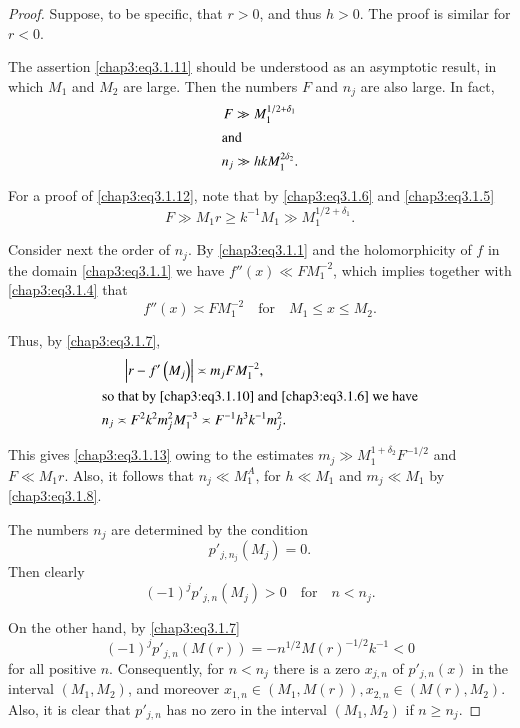 \begin{proof}
Suppose, to be specific, that $r>0$, and thus $h>0$. The proof is
similar for $r<0$.

The assertion \eqref{chap3:eq3.1.11} should be understood as an
asymptotic result, in which $M_1$ and $M_2$ are large. Then the
numbers $F$ and $n_j$ are also large. In fact,
\begin{gather}
F\gg M_1^{1/2+\delta_1}\label{chap3:eq3.1.12}\\
\intertext{and}
n_j\gg hkM_1^{2\delta_2}.\label{chap3:eq3.1.13}
\end{gather}

For a proof of \eqref{chap3:eq3.1.12}, note that by
\eqref{chap3:eq3.1.6} and \eqref{chap3:eq3.1.5}
$$
F\gg M_1r\geq k^{-1}M_1\gg M_1^{1/2+\delta_1}.
$$

Consider next the order of $n_j$. By \eqref{chap3:eq3.1.1} and the
holomorphicity of $f$ in the domain \eqref{chap3:eq3.1.1} we have
$f''(x)\ll FM_1^{-2}$, which implies together with
\eqref{chap3:eq3.1.4} that
\begin{equation}\label{chap3:eq3.1.14}
f''(x)\asymp FM_1^{-2}\quad\text{for}\quad M_1\leq x\leq M_2.
\end{equation}

Thus, by \eqref{chap3:eq3.1.7}, 
\begin{gather}
\left|r-f'\left(M_j\right)\right|\asymp
m_jFM_1^{-2},\label{chap3:eq3.1.15}\\
\intertext{so that by \eqref{chap3:eq3.1.10} and \eqref{chap3:eq3.1.6}
we have}
n_j\asymp F^2k^2m_j^2M_1^{-3}\asymp
F^{-1}h^3k^{-1}m_j^2.\label{chap3:eq3.1.16} 
\end{gather}\pageoriginale

This gives \eqref{chap3:eq3.1.13} owing to the estimates $m_j\gg
M_1^{1+\delta_2}F^{-1/2}$ and $F\ll M_1r$. Also, it follows that
$n_j\ll M_1^A$, for $h\ll M_1$ and $m_j\ll M_1$ by
\eqref{chap3:eq3.1.8}. 

The numbers $n_j$ are determined by the condition 
\begin{equation}\label{chap3:eq3.1.17}
p'_{j,n_j}\left(M_j\right)=0.
\end{equation}
Then clearly 
$$
(-1)^jp'_{j,n}\left(M_j\right)>0\quad\text{for}\quad n<n_j.
$$

On the other hand, by \eqref{chap3:eq3.1.7}
$$
(-1)^jp'_{j,n}(M(r))=-n^{1/2}M(r)^{-1/2}k^{-1}<0
$$
for all positive $n$. Consequently, for $n<n_j$ there is a zero
$x_{j,n}$ of $p'_{j,n}(x)$ in the interval $(M_1,M_2)$, and moreover
$x_{1,n}\in(M_1,M(r)), x_{2,n}\in(M(r),M_2)$. Also, it is clear that
$p'_{j,n}$ has no zero in the interval $(M_1,M_2)$ if $n\geq n_j$.


\end{proof}
